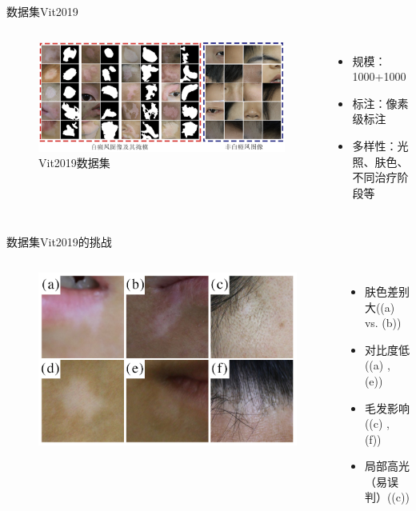 \begin{frame}{数据集Vit2019}
\begin{columns}[c]
\begin{figure}
    \centering
    \includegraphics[width=\linewidth]{figures/chap2_DatasetGragh1.png}
    \caption{Vit2019数据集}
\end{figure}

\begin{itemize}
\item 规模：1000+1000
\item 标注：像素级标注
\item 多样性：光照、肤色、不同治疗阶段等
\end{itemize}
\end{columns}

\end{frame}
\begin{frame}{数据集Vit2019的挑战}
\begin{columns}[c]
\begin{figure}
    \centering
    \includegraphics[width=\linewidth]{figures/chap1_challenge.jpg}
\end{figure}

\begin{itemize}
\item 肤色差别大((a) vs. (b))
\item 对比度低((a) , (e))
\item 毛发影响((c) , (f))
\item 局部高光（易误判）((c))
\end{itemize}
\end{columns}
\end{frame}
